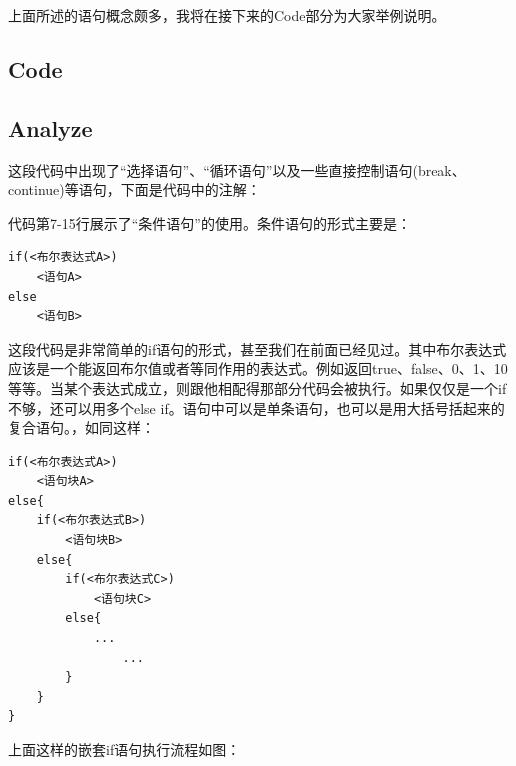 上面所述的语句概念颇多，我将在接下来的Code部分为大家举例说明。

\subsection{Code}



\subsection{Analyze}
这段代码中出现了“选择语句”、“循环语句”以及一些直接控制语句(break、continue)等语句，下面是代码中的注解：
\begin{quote}
\showremarks
\end{quote}

代码第7-15行展示了“条件语句”的使用。条件语句的形式主要是：

\begin{lstlisting}[xleftmargin=10em,xrightmargin=10em]
if(<布尔表达式A>)
    <语句A>
else
    <语句B>
\end{lstlisting}

这段代码是非常简单的if语句的形式，甚至我们在前面已经见过。其中布尔表达式应该是一个能返回布尔值或者等同作用的表达式。例如返回true、false、0、1、10等等。当某个表达式成立，则跟他相配得那部分代码会被执行。如果仅仅是一个if不够，还可以用多个else if。语句中可以是单条语句，也可以是用大括号括起来的复合语句。，如同这样：

\begin{lstlisting}[xleftmargin=6em,xrightmargin=6em]
if(<布尔表达式A>)
    <语句块A>
else{
    if(<布尔表达式B>)
        <语句块B>
    else{
        if(<布尔表达式C>)
            <语句块C>
        else{
            ...
                ...
        }
    }
}
\end{lstlisting}

上面这样的嵌套if语句执行流程如图：

